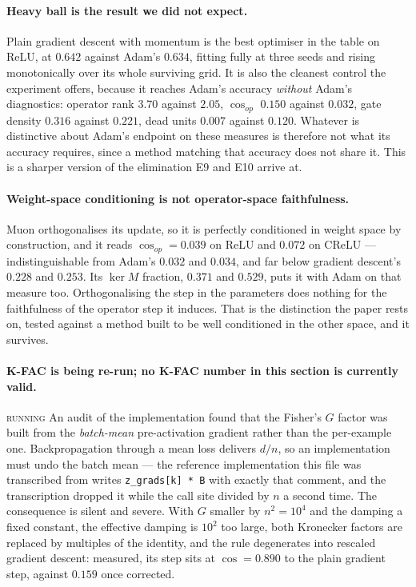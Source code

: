 \documentclass{article} %
\theoremstyle{plain}
\theoremstyle{definition}
\theoremstyle{remark}
\newcommand{\RUNNING}{{\footnotesize\textsc{running}}}
\begin{document}
\paragraph{Heavy ball is the result we did not expect.}
Plain gradient descent with momentum is the best optimiser in the table on ReLU, at $0.642$ against
Adam's $0.634$, fitting fully at three seeds and rising monotonically over its whole surviving
grid. It is also the cleanest control the experiment offers, because it reaches Adam's accuracy
\emph{without} Adam's diagnostics: operator rank $3.70$ against $2.05$, $\cos_{op}$ $0.150$ against
$0.032$, gate density $0.316$ against $0.221$, dead units $0.007$ against $0.120$. Whatever is
distinctive about Adam's endpoint on these measures is therefore not what its accuracy requires,
since a method matching that accuracy does not share it. This is a sharper version of the
elimination E9 and E10 arrive at.

\paragraph{Weight-space conditioning is not operator-space faithfulness.}
Muon orthogonalises its update, so it is perfectly conditioned in weight space by construction, and
it reads $\cos_{op} = 0.039$ on ReLU and $0.072$ on CReLU --- indistinguishable from Adam's
$0.032$ and $0.034$, and far below gradient descent's $0.228$ and $0.253$. Its $\ker M$ fraction,
$0.371$ and $0.529$, puts it with Adam on that measure too. Orthogonalising the step in the parameters does nothing
for the faithfulness of the operator step it induces. That is the distinction the paper rests on,
tested against a method built to be well conditioned in the other space, and it survives.

\paragraph{K-FAC is being re-run; no K-FAC number in this section is currently valid.}
\RUNNING{} An audit of the implementation found that the Fisher's $G$ factor was built from the
\emph{batch-mean} pre-activation gradient rather than the per-example one. Backpropagation through
a mean loss delivers $d/n$, so an implementation must undo the batch mean --- the reference
implementation this file was transcribed from writes \texttt{z\_grads[k] * B} with exactly that
comment, and the transcription dropped it while the call site divided by $n$ a second time. The
consequence is silent and severe. With $G$ smaller by $n^2 = 10^4$ and the damping a fixed
constant, the effective damping is $10^2$ too large, both Kronecker factors are replaced by
multiples of the identity, and the rule degenerates into rescaled gradient descent: measured, its
step sits at $\cos = 0.890$ to the plain gradient step, against $0.159$ once corrected.
\end{document}
